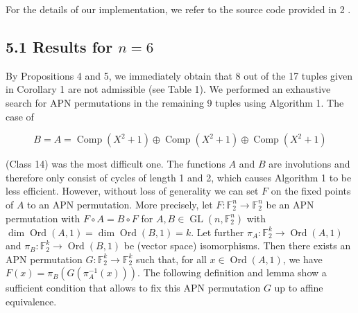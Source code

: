 \documentclass[10pt]{article}
\begin{document}
For the details of our implementation, we refer to the source code provided in 2 .

\subsection*{5.1 Results for $n=6$}
By Propositions 4 and 5, we immediately obtain that 8 out of the 17 tuples given in Corollary 1 are not admissible (see Table 1). We performed an exhaustive search for APN permutations in the remaining 9 tuples using Algorithm 1. The case of


\begin{equation*}
B=A=\operatorname{Comp}\left(X^{2}+1\right) \oplus \operatorname{Comp}\left(X^{2}+1\right) \oplus \operatorname{Comp}\left(X^{2}+1\right) \tag{2}
\end{equation*}


(Class 14) was the most difficult one. The functions $A$ and $B$ are involutions and therefore only consist of cycles of length 1 and 2, which causes Algorithm 1 to be less efficient. However, without loss of generality we can set $F$ on the fixed points of $A$ to an APN permutation. More precisely, let $F: \mathbb{F}_{2}^{n} \rightarrow \mathbb{F}_{2}^{n}$ be an APN permutation with $F \circ A=B \circ F$ for $A, B \in \operatorname{GL}\left(n, \mathbb{F}_{2}^{n}\right)$ with $\operatorname{dim} \operatorname{Ord}(A, 1)=\operatorname{dim} \operatorname{Ord}(B, 1)=k$. Let further $\pi_{A}: \mathbb{F}_{2}^{k} \rightarrow \operatorname{Ord}(A, 1)$ and $\pi_{B}: \mathbb{F}_{2}^{k} \rightarrow \operatorname{Ord}(B, 1)$ be (vector space) isomorphisms. Then there exists an APN permutation $G: \mathbb{F}_{2}^{k} \rightarrow \mathbb{F}_{2}^{k}$ such that, for all $x \in \operatorname{Ord}(A, 1)$, we have $F(x)=\pi_{B}\left(G\left(\pi_{A}^{-1}(x)\right)\right)$. The following definition and lemma show a sufficient condition that allows to fix this APN permutation $G$ up to affine equivalence.
\end{document}
